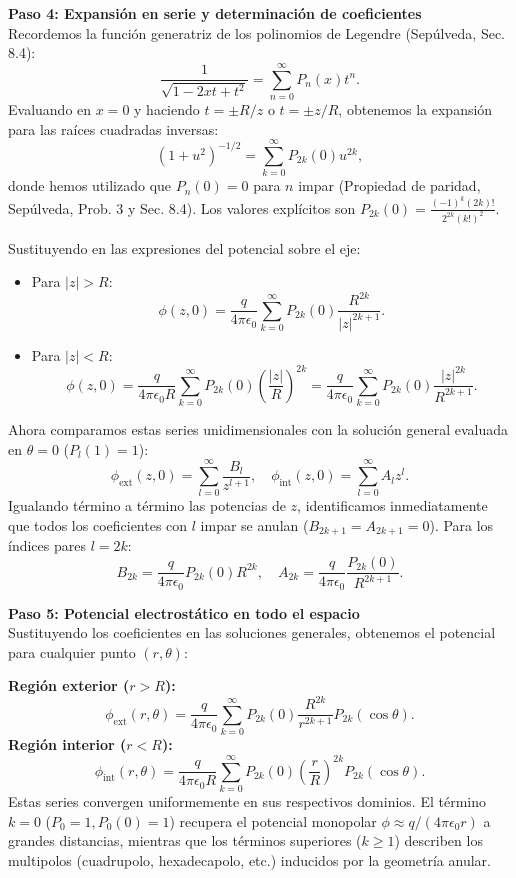 \documentclass[a4paper]{article}
\begin{document}
\vspace{0.3cm}
\noindent\textbf{Paso 4: Expansión en serie y determinación de coeficientes}\\
Recordemos la función generatriz de los polinomios de Legendre (Sepúlveda, Sec. 8.4):
$$
\frac{1}{\sqrt{1 - 2xt + t^2}} = \sum_{n=0}^{\infty} P_n(x) t^n.
$$
Evaluando en $x=0$ y haciendo $t = \pm R/z$ o $t = \pm z/R$, obtenemos la expansión para las raíces cuadradas inversas:
$$
\left(1 + u^2\right)^{-1/2} = \sum_{k=0}^{\infty} P_{2k}(0) u^{2k},
$$
donde hemos utilizado que $P_n(0) = 0$ para $n$ impar (Propiedad de paridad, Sepúlveda, Prob. 3 y Sec. 8.4). Los valores explícitos son $P_{2k}(0) = \frac{(-1)^k (2k)!}{2^{2k} (k!)^2}$.

Sustituyendo en las expresiones del potencial sobre el eje:
\begin{itemize}
    \item Para $|z| > R$:
    $$
    \phi(z, 0) = \frac{q}{4\pi\epsilon_0} \sum_{k=0}^{\infty} P_{2k}(0) \frac{R^{2k}}{|z|^{2k+1}}.
    $$
    \item Para $|z| < R$:
    $$
    \phi(z, 0) = \frac{q}{4\pi\epsilon_0 R} \sum_{k=0}^{\infty} P_{2k}(0) \left(\frac{|z|}{R}\right)^{2k} = \frac{q}{4\pi\epsilon_0} \sum_{k=0}^{\infty} P_{2k}(0) \frac{|z|^{2k}}{R^{2k+1}}.
    $$
\end{itemize}
Ahora comparamos estas series unidimensionales con la solución general evaluada en $\theta=0$ ($P_l(1)=1$):
$$
\phi_{\text{ext}}(z, 0) = \sum_{l=0}^{\infty} \frac{B_l}{z^{l+1}}, \quad \phi_{\text{int}}(z, 0) = \sum_{l=0}^{\infty} A_l z^l.
$$
Igualando término a término las potencias de $z$, identificamos inmediatamente que todos los coeficientes con $l$ impar se anulan ($B_{2k+1} = A_{2k+1} = 0$). Para los índices pares $l=2k$:
$$
B_{2k} = \frac{q}{4\pi\epsilon_0} P_{2k}(0) R^{2k}, \quad A_{2k} = \frac{q}{4\pi\epsilon_0} \frac{P_{2k}(0)}{R^{2k+1}}.
$$

\vspace{0.3cm}
\noindent\textbf{Paso 5: Potencial electrostático en todo el espacio}\\
Sustituyendo los coeficientes en las soluciones generales, obtenemos el potencial para cualquier punto $(r, \theta)$:

\noindent\textbf{Región exterior ($r > R$):}
$$
\phi_{\text{ext}}(r, \theta) = \frac{q}{4\pi\epsilon_0} \sum_{k=0}^{\infty} P_{2k}(0) \frac{R^{2k}}{r^{2k+1}} P_{2k}(\cos\theta).
$$
\noindent\textbf{Región interior ($r < R$):}
$$
\phi_{\text{int}}(r, \theta) = \frac{q}{4\pi\epsilon_0 R} \sum_{k=0}^{\infty} P_{2k}(0) \left(\frac{r}{R}\right)^{2k} P_{2k}(\cos\theta).
$$
Estas series convergen uniformemente en sus respectivos dominios. El término $k=0$ ($P_0=1, P_0(0)=1$) recupera el potencial monopolar $\phi \approx q/(4\pi\epsilon_0 r)$ a grandes distancias, mientras que los términos superiores ($k\geq 1$) describen los multipolos (cuadrupolo, hexadecapolo, etc.) inducidos por la geometría anular.
\end{document}
